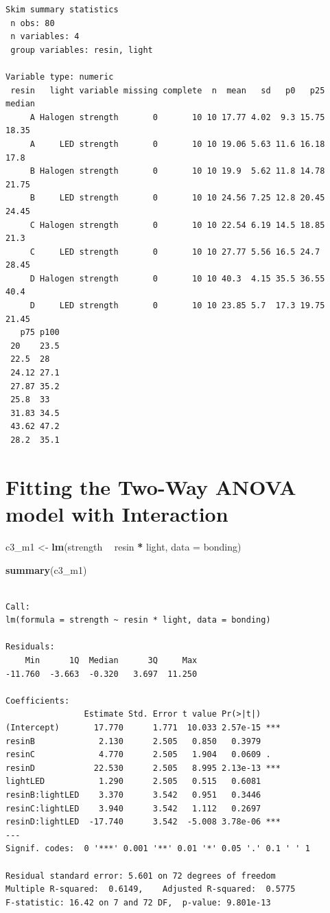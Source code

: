 \documentclass[]{book}
\newenvironment{Shaded}{\begin{snugshade}}{\end{snugshade}}
\newcommand{\KeywordTok}[1]{\textcolor[rgb]{0.13,0.29,0.53}{\textbf{#1}}}
\newcommand{\DataTypeTok}[1]{\textcolor[rgb]{0.13,0.29,0.53}{#1}}
\newcommand{\StringTok}[1]{\textcolor[rgb]{0.31,0.60,0.02}{#1}}
\newcommand{\OperatorTok}[1]{\textcolor[rgb]{0.81,0.36,0.00}{\textbf{#1}}}
\newcommand{\NormalTok}[1]{#1}
\theoremstyle{definition}
\theoremstyle{definition}
\theoremstyle{definition}
\theoremstyle{remark}
\begin{document}
\begin{verbatim}
Skim summary statistics
 n obs: 80 
 n variables: 4 
 group variables: resin, light 

Variable type: numeric 
 resin   light variable missing complete  n  mean   sd   p0   p25 median
     A Halogen strength       0       10 10 17.77 4.02  9.3 15.75  18.35
     A     LED strength       0       10 10 19.06 5.63 11.6 16.18  17.8 
     B Halogen strength       0       10 10 19.9  5.62 11.8 14.78  21.75
     B     LED strength       0       10 10 24.56 7.25 12.8 20.45  24.45
     C Halogen strength       0       10 10 22.54 6.19 14.5 18.85  21.3 
     C     LED strength       0       10 10 27.77 5.56 16.5 24.7   28.45
     D Halogen strength       0       10 10 40.3  4.15 35.5 36.55  40.4 
     D     LED strength       0       10 10 23.85 5.7  17.3 19.75  21.45
   p75 p100
 20    23.5
 22.5  28  
 24.12 27.1
 27.87 35.2
 25.8  33  
 31.83 34.5
 43.62 47.2
 28.2  35.1
\end{verbatim}

\section{Fitting the Two-Way ANOVA model with
Interaction}\label{fitting-the-two-way-anova-model-with-interaction}

\begin{Shaded}
\begin{Highlighting}[]
\NormalTok{c3_m1 <-}\StringTok{ }\KeywordTok{lm}\NormalTok{(strength }\OperatorTok{~}\StringTok{ }\NormalTok{resin }\OperatorTok{*}\StringTok{ }\NormalTok{light, }\DataTypeTok{data =}\NormalTok{ bonding)}

\KeywordTok{summary}\NormalTok{(c3_m1)}
\end{Highlighting}
\end{Shaded}

\begin{verbatim}

Call:
lm(formula = strength ~ resin * light, data = bonding)

Residuals:
    Min      1Q  Median      3Q     Max 
-11.760  -3.663  -0.320   3.697  11.250 

Coefficients:
                Estimate Std. Error t value Pr(>|t|)    
(Intercept)       17.770      1.771  10.033 2.57e-15 ***
resinB             2.130      2.505   0.850   0.3979    
resinC             4.770      2.505   1.904   0.0609 .  
resinD            22.530      2.505   8.995 2.13e-13 ***
lightLED           1.290      2.505   0.515   0.6081    
resinB:lightLED    3.370      3.542   0.951   0.3446    
resinC:lightLED    3.940      3.542   1.112   0.2697    
resinD:lightLED  -17.740      3.542  -5.008 3.78e-06 ***
---
Signif. codes:  0 '***' 0.001 '**' 0.01 '*' 0.05 '.' 0.1 ' ' 1

Residual standard error: 5.601 on 72 degrees of freedom
Multiple R-squared:  0.6149,    Adjusted R-squared:  0.5775 
F-statistic: 16.42 on 7 and 72 DF,  p-value: 9.801e-13
\end{verbatim}
\end{document}
